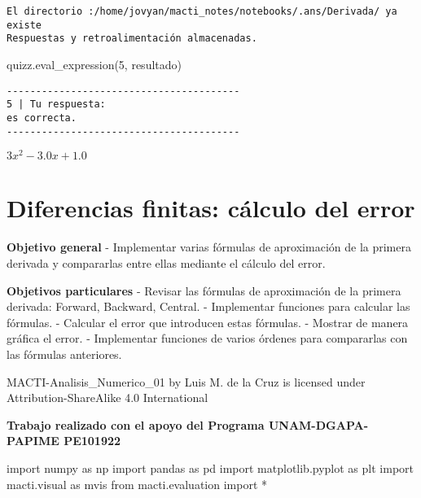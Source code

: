 \documentclass[
  letterpaper,
  DIV=11,
  numbers=noendperiod]{scrreprt}
\newenvironment{Shaded}{\begin{snugshade}}{\end{snugshade}}
\newcommand{\ImportTok}[1]{\textcolor[rgb]{0.00,0.46,0.62}{#1}}
\newcommand{\NormalTok}[1]{\textcolor[rgb]{0.00,0.23,0.31}{#1}}
\newcommand{\OperatorTok}[1]{\textcolor[rgb]{0.37,0.37,0.37}{#1}}
\newcommand{\StringTok}[1]{\textcolor[rgb]{0.13,0.47,0.30}{#1}}
\begin{document}
\begin{verbatim}
El directorio :/home/jovyan/macti_notes/notebooks/.ans/Derivada/ ya existe
Respuestas y retroalimentación almacenadas.
\end{verbatim}

\begin{Shaded}
\begin{Highlighting}[]
\NormalTok{quizz.eval\_expression(}\StringTok{\textquotesingle{}5\textquotesingle{}}\NormalTok{, resultado)}
\end{Highlighting}
\end{Shaded}

\begin{verbatim}
----------------------------------------
5 | Tu respuesta:
es correcta.
----------------------------------------
\end{verbatim}

$\displaystyle 3 x^{2} - 3.0 x + 1.0$


\chapter{Diferencias finitas: cálculo del
error}\label{diferencias-finitas-cuxe1lculo-del-error}

\textbf{Objetivo general} - Implementar varias fórmulas de aproximación
de la primera derivada y compararlas entre ellas mediante el cálculo del
error.

\textbf{Objetivos particulares} - Revisar las fórmulas de aproximación
de la primera derivada: Forward, Backward, Central. - Implementar
funciones para calcular las fórmulas. - Calcular el error que introducen
estas fórmulas. - Mostrar de manera gráfica el error. - Implementar
funciones de varios órdenes para compararlas con las fórmulas
anteriores.

MACTI-Analisis\_Numerico\_01 by Luis M. de la Cruz is licensed under
Attribution-ShareAlike 4.0 International

\textbf{Trabajo realizado con el apoyo del Programa UNAM-DGAPA-PAPIME
PE101922}

\begin{Shaded}
\begin{Highlighting}[]
\ImportTok{import}\NormalTok{ numpy }\ImportTok{as}\NormalTok{ np}
\ImportTok{import}\NormalTok{ pandas }\ImportTok{as}\NormalTok{ pd}
\ImportTok{import}\NormalTok{ matplotlib.pyplot }\ImportTok{as}\NormalTok{ plt}
\ImportTok{import}\NormalTok{ macti.visual }\ImportTok{as}\NormalTok{ mvis}
\ImportTok{from}\NormalTok{ macti.evaluation }\ImportTok{import} \OperatorTok{*}
\end{Highlighting}
\end{Shaded}
\end{document}
